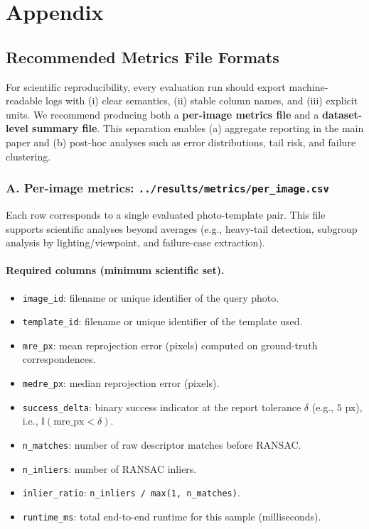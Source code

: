 
\section{Appendix}
\label{sec:appendix}

\subsection{Recommended Metrics File Formats}
\label{subsec:appendix_metrics_formats}

For scientific reproducibility, every evaluation run should export machine-readable logs with (i) clear semantics, (ii) stable column names, and (iii) explicit units. We recommend producing both a \textbf{per-image metrics file} and a \textbf{dataset-level summary file}. This separation enables (a) aggregate reporting in the main paper and (b) post-hoc analyses such as error distributions, tail risk, and failure clustering.

\subsubsection*{A. Per-image metrics: \texttt{../results/metrics/per\_image.csv}}
Each row corresponds to a single evaluated photo-template pair. This file supports scientific analyses beyond averages (e.g., heavy-tail detection, subgroup analysis by lighting/viewpoint, and failure-case extraction).

\paragraph{Required columns (minimum scientific set).}
\begin{itemize}
  \item \texttt{image\_id}: filename or unique identifier of the query photo.
  \item \texttt{template\_id}: filename or unique identifier of the template used.
  \item \texttt{mre\_px}: mean reprojection error (pixels) computed on ground-truth correspondences.
  \item \texttt{medre\_px}: median reprojection error (pixels).
  \item \texttt{success\_delta}: binary success indicator at the report tolerance $\delta$ (e.g., $5$ px), i.e., $\mathbb{I}(\text{mre\_px}<\delta)$.
  \item \texttt{n\_matches}: number of raw descriptor matches before RANSAC.
  \item \texttt{n\_inliers}: number of RANSAC inliers.
  \item \texttt{inlier\_ratio}: \texttt{n\_inliers / max(1, n\_matches)}.
  \item \texttt{runtime\_ms}: total end-to-end runtime for this sample (milliseconds).
\end{itemize}


